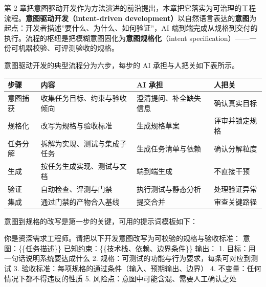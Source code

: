 \documentclass[12pt,a4paper,twoside,openany]{ctexbook}
\numberwithin{figure}{chapter}
\numberwithin{table}{chapter}
\newenvironment{Shaded}{}{}
\newcommand{\NormalTok}[1]{#1}
\newcounter{none}
\begin{document}
第 2
章把意图驱动开发作为方法演进的前沿提出，本章把它落实为可治理的工程流程。\textbf{意图驱动开发（intent-driven
development）}以自然语言表达的\textbf{意图}为起点：开发者描述''要什么、为什么、如何验证''，AI
端到端完成从规格到交付的执行。流程的枢纽是把模糊意图固化为\textbf{意图规格化}（intent
specification）------一份可机器校验、可评测验收的规格。

意图驱动开发的典型流程分为六步，每步的 AI 承担与人把关如下表所示。

{\def\LTcaptype{none} %
\begin{longtable}[]{@{}
  >{\raggedright\arraybackslash}p{}
  >{\raggedright\arraybackslash}p{}
  >{\raggedright\arraybackslash}p{}
  >{\raggedright\arraybackslash}p{}@{}}
\toprule\noalign{}
\begin{minipage}[b]{\linewidth}\raggedright
步骤
\end{minipage} & \begin{minipage}[b]{\linewidth}\raggedright
内容
\end{minipage} & \begin{minipage}[b]{\linewidth}\raggedright
AI 承担
\end{minipage} & \begin{minipage}[b]{\linewidth}\raggedright
人把关
\end{minipage} \\
\midrule\noalign{}
\endhead
\bottomrule\noalign{}
\endlastfoot
意图捕获 & 收集任务目标、约束与验收倾向 & 澄清提问、补全缺失信息 &
确认真实目标 \\
规格化 & 改写为规格与验收标准 & 生成规格草案 & 评审并锁定规格 \\
任务分解 & 拆解为实现、测试与集成子任务 & 生成任务清单与依赖 &
确认分解粒度 \\
生成 & 按任务生成实现、测试与文档 & 端到端生成 & 不直接干预 \\
验证 & 自动检查、评测与门禁 & 执行测试与静态分析 & 处理验证异常 \\
集成 & 通过门禁的产物合入基线 & 提交合并 & 审查关键路径 \\
\end{longtable}
}

意图到规格的改写是第一步的关键，可用的提示词模板如下：

\begin{Shaded}
\begin{Highlighting}[]
\NormalTok{你是资深需求工程师。请把以下开发意图改写为可校验的规格与验收标准：}
\NormalTok{意图：\{\{任务描述\}\}}
\NormalTok{已知约束：\{\{技术栈、依赖、边界条件\}\}}
\NormalTok{输出：}
\NormalTok{1. 目标：用一句话说明系统要达成什么}
\NormalTok{2. 规格：可测试的功能与行为要求，每条可对应到测试}
\NormalTok{3. 验收标准：每项规格的通过条件（输入、预期输出、边界）}
\NormalTok{4. 不变量：任何情况下都不得违反的性质}
\NormalTok{5. 风险点：意图中可能含混、需要人工确认之处}
\end{Highlighting}
\end{Shaded}
\end{document}
